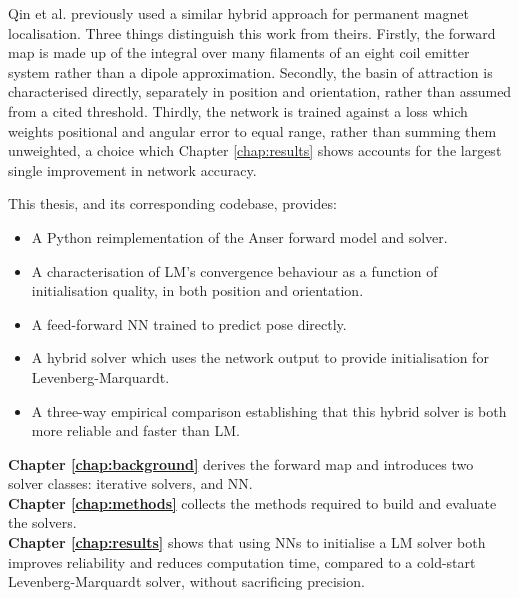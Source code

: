 Qin et al. \cite{qin2022} previously used a similar hybrid approach for permanent magnet localisation. Three things distinguish this work from theirs. Firstly, the forward map is made up of the integral over many filaments of an eight coil emitter system rather than a dipole approximation. Secondly, the basin of attraction is characterised directly, separately in position and orientation, rather than assumed from a cited threshold. Thirdly, the network is trained against a loss which weights positional and angular error to equal range, rather than summing them unweighted, a choice which Chapter \ref{chap:results} shows accounts for the largest single improvement in network accuracy. 



This thesis, and its corresponding codebase, provides:
\begin{itemize}
  \item A Python reimplementation of the Anser forward model and solver. 
  \item A characterisation of LM's convergence behaviour as a function of initialisation quality, in both position and orientation.
  \item A feed-forward NN trained to predict pose directly. 
  \item A hybrid solver which uses the network output to provide initialisation for Levenberg-Marquardt.
  \item A three-way empirical comparison establishing that this hybrid solver is both more reliable and faster than LM.
\end{itemize}
\textbf{Chapter \ref{chap:background}} derives the forward map and introduces two solver classes: iterative solvers, and NN. 
\\
\textbf{Chapter \ref{chap:methods}} collects the methods required to build and evaluate the solvers. 
\\
\textbf{Chapter \ref{chap:results}} shows that using NNs to initialise a LM solver both improves reliability and reduces computation time, compared to a cold-start Levenberg-Marquardt solver, without sacrificing precision.
